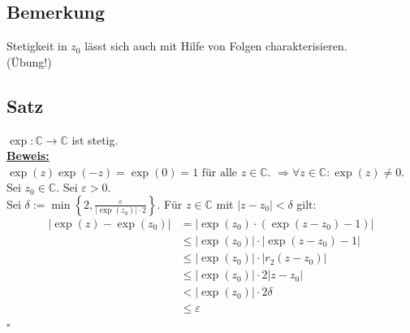 \subsection{Bemerkung} %
\label{sub:bemerkung}
Stetigkeit in $z_0$ lässt sich auch mit Hilfe von Folgen charakterisieren. \\
(Übung!)

\subsection{Satz} %
\label{sub:satz}
$\exp : \mathds{C} \to \mathds{C}$ ist stetig. 
\vspace{10pt} \\
\underline{\textbf{Beweis:}} \\
$\exp (z) \exp (-z)= \exp (0)=1 \text{ für alle } z \in \mathds{C}$. $\Rightarrow  \forall z \in \mathds{C} 
: \exp (z)\not= 0$. Sei $z_0 \in \mathds{C}$. Sei $\varepsilon>0$. \\
Sei $\delta := \min \left\{2 , \frac{\varepsilon}{|\exp (z_0)| \cdot  2} \right\} $. Für $z \in \mathds{C}$ mit $|z-z_0 | < \delta$ gilt:
\begin{align*}
	| \exp (z)- \exp (z_0)| &= |\exp (z_0) \cdot (\exp (z-z_0) -1) | \\
	&\le | \exp (z_0)| \cdot | \exp (z-z_0) -1 | \\
	&\le |\exp (z_0)| \cdot | r_{2}(z-z_0) | \tag{falls $|z-z_0| \le 2$}\\
	&\le |\exp (z_0) | \cdot 2 |z-z_0| \\
	&< |\exp (z_0)| \cdot 2 \delta \\
	&\le \varepsilon
\end{align*}
\hfill \( \square \)

